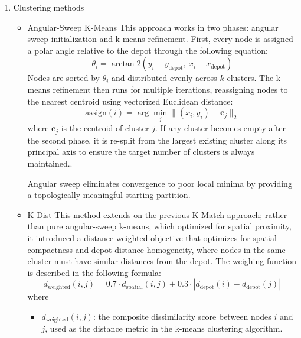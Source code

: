 \documentclass[a4paper]{report}
\begin{document}
{\begin{itemize}
\begin{enumerate}
    After testing both approaches and analyzing the results as shown in \ref{results de}, the $\sqrt{n}$ approach was integrated into the pipeline. 
    \item Clustering methods
    \begin{itemize}
        \item Angular-Sweep K-Means \newline
        This approach works in two phases: angular sweep initialization and k-means refinement. 
        First, every node is assigned a polar angle relative to the depot through the following equation:
        \[
        \theta_i = \arctan2\!\left(y_i - y_{\text{depot}},\ x_i - x_{\text{depot}}\right)
        \]
        Nodes are sorted by $\theta_i$  and distributed evenly across $k$ clusters. The k-means refinement then runs for multiple iterations, reassigning nodes to the nearest centroid using vectorized Euclidean distance:
\begin{equation}
    \text{assign}(i) = \arg\min_{j} \| (x_i, y_i) - \mathbf{c}_j \|_2
\end{equation}
where $\mathbf{c}_j$ is the centroid of cluster $j$.  If any cluster becomes empty after the second phase, it is re-split from the largest existing cluster along its principal axis to ensure the target number of clusters is always maintained.\cite{sweep}.
      
        Angular sweep eliminates convergence to poor local minima by providing a topologically meaningful starting partition. 
        


    
        \item K-Dist\newline
        This method extends on the previous K-Match approach; rather than pure angular-sweep k-means, which optimized for spatial proximity, it introduced a distance-weighted objective that optimizes for spatial compactness and depot-distance homogeneity, where nodes in the same cluster must have similar distances from the depot.
        The weighing function is described in the following formula: 
        \[
        d_{\text{weighted}}(i, j) = 0.7 \cdot d_{\text{spatial}}(i, j) + 0.3 \cdot \left| d_{\text{depot}}(i) - d_{\text{depot}}(j) \right|
        \]
        where
        \begin{itemize}
            \item $d_{\text{weighted}}(i, j)$: the composite dissimilarity score between nodes $i$ and $j$, 
            used as the distance metric in the k-means clustering algorithm.
        

\end{itemize}
\end{itemize}
\end{enumerate}
\end{itemize}}
\end{document}
